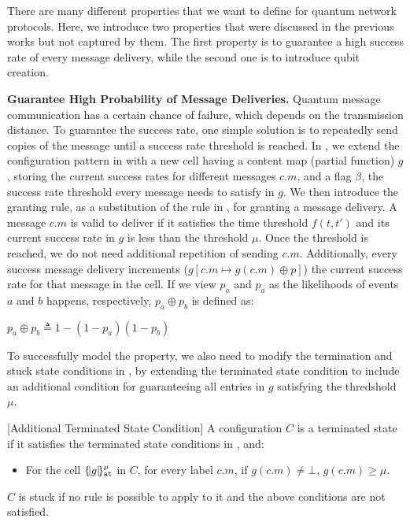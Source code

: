There are many different properties that we want to define for quantum network protocols.
Here, we introduce two properties that were discussed in the previous works but not captured by them. 
The first property is to guarantee a high success rate of every message delivery,
while the second one is to introduce qubit creation. 

\noindent\textbf{Guarantee High Probability of Message Deliveries.}
Quantum message communication has a certain chance of failure, which depends on the transmission distance.
To guarantee the success rate, one simple solution is to repeatedly send copies of the message until a success rate threshold is reached.
In , we extend the configuration pattern in  with a new cell  having a content map (partial function) $g$, storing the current success rates for different messages $c.m$, and a flag $\beta$, the success rate threshold every message needs to satisfy in $g$.
We then introduce the  granting rule, as a substitution of the  rule in ,
for granting a message delivery.
A message $c.m$ is valid to deliver if it satisfies the time threshold $f(t,t')$
and its current success rate in $g$ is less than the threshold $\mu$.
Once the threshold is reached, we do not need additional repetition of sending $c.m$.
Additionally, every success message delivery increments ($g[c.m\mapsto g(c.m)\oplus p]$) the current success rate for that message in the  cell. If we view $p_a$ and $p_a$ as the likelihoods of events $a$ and $b$ happens, respectively,
$p_a\oplus p_b$ is defined as:
{\small
\begin{center}
$p_a\oplus p_b \triangleq 1 - (1-p_a)(1-p_b)$
\end{center}
}

To successfully model the property, we also need to modify the termination and stuck state conditions in ,
by extending the terminated state condition to include an additional condition for guaranteeing all entries in $g$ satisfying the thredshold $\mu$.

\begin{definition}\label{def:stuck1}\rm[Additional Terminated State Condition]
A configuration $C$ is a terminated state if it satisfies the terminated state conditions in , and:
\begin{itemize}
\item For the  cell $\{\!| g |\!\}^{\mu}_{\texttt{at}}$ in $C$, for every label $c.m$, if $g(c.m)\neq \bot$, $g(c.m)\ge \mu$.
\end{itemize}
$C$ is stuck if no rule is possible to apply to it and the above conditions are not satisfied.
\end{definition}

